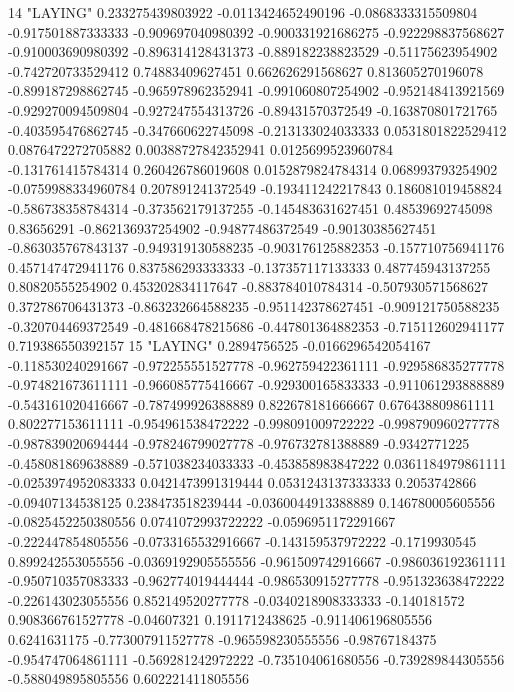 14 "LAYING" 0.233275439803922 -0.0113424652490196 -0.0868333315509804 -0.917501887333333 -0.909697040980392 -0.900331921686275 -0.922298837568627 -0.910003690980392 -0.896314128431373 -0.889182238823529 -0.51175623954902 -0.742720733529412 0.74883409627451 0.662626291568627 0.813605270196078 -0.899187298862745 -0.965978962352941 -0.991060807254902 -0.952148413921569 -0.929270094509804 -0.927247554313726 -0.89431570372549 -0.163870801721765 -0.403595476862745 -0.347660622745098 -0.213133024033333 0.0531801822529412 0.0876472272705882 0.00388727842352941 0.0125699523960784 -0.131761415784314 0.260426786019608 0.0152879824784314 0.068993793254902 -0.0759988334960784 0.207891241372549 -0.193411242217843 0.186081019458824 -0.586738358784314 -0.373562179137255 -0.145483631627451 0.48539692745098 0.83656291 -0.862136937254902 -0.94877486372549 -0.90130385627451 -0.863035767843137 -0.949319130588235 -0.903176125882353 -0.157710756941176 0.457147472941176 0.837586293333333 -0.137357117133333 0.487745943137255 0.80820555254902 0.453202834117647 -0.883784010784314 -0.507930571568627 0.372786706431373 -0.863232664588235 -0.951142378627451 -0.909121750588235 -0.320704469372549 -0.481668478215686 -0.447801364882353 -0.715112602941177 0.719386550392157
15 "LAYING" 0.2894756525 -0.0166296542054167 -0.118530240291667 -0.972255551527778 -0.962759422361111 -0.929586835277778 -0.974821673611111 -0.966085775416667 -0.929300165833333 -0.911061293888889 -0.543161020416667 -0.787499926388889 0.822678181666667 0.676438809861111 0.802277153611111 -0.954961538472222 -0.998091009722222 -0.998790960277778 -0.987839020694444 -0.978246799027778 -0.976732781388889 -0.9342771225 -0.458081869638889 -0.571038234033333 -0.453858983847222 0.0361184979861111 -0.0253974952083333 0.0421473991319444 0.0531243137333333 0.2053742866 -0.09407134538125 0.238473518239444 -0.0360044913388889 0.146780005605556 -0.0825452250380556 0.0741072993722222 -0.0596951172291667 -0.222447854805556 -0.0733165532916667 -0.143159537972222 -0.1719930545 0.899242553055556 -0.0369192905555556 -0.961509742916667 -0.986036192361111 -0.950710357083333 -0.962774019444444 -0.986530915277778 -0.951323638472222 -0.226143023055556 0.852149520277778 -0.0340218908333333 -0.140181572 0.908366761527778 -0.04607321 0.1911712438625 -0.911406196805556 0.6241631175 -0.773007911527778 -0.965598230555556 -0.98767184375 -0.954747064861111 -0.569281242972222 -0.735104061680556 -0.739289844305556 -0.588049895805556 0.602221411805556
